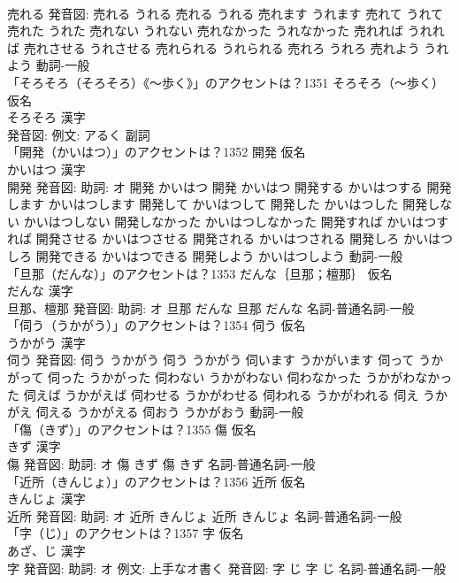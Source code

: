 \documentclass[8pt]{extreport}
\begin{document}
\begin{CJK}{UTF8}{min}
\\	売れる 発音図:	売れる うれる		売れる うれる 売れます うれます 売れて うれて 売れた うれた 売れない うれない 売れなかった うれなかった 売れれば うれれば 売れさせる うれさせる 売れられる うれられる 売れろ うれろ 売れよう うれよう				動詞-一般 
\\	「そろそろ（そろそろ）《〜歩く》」のアクセントは？1351	そろそろ（〜歩く） 仮名　
\\	そろそろ 漢字　
\\	発音図: 例文: アるく							副詞 
\\	「開発（かいはつ）」のアクセントは？1352	開発 仮名　
\\	かいはつ 漢字　
\\	開発 発音図: 助詞: オ	開発 かいはつ		開発 かいはつ 開発する かいはつする 開発します かいはつします 開発して かいはつして 開発した かいはつした 開発しない かいはつしない 開発しなかった かいはつしなかった 開発すれば かいはつすれば 開発させる かいはつさせる 開発される かいはつされる 開発しろ かいはつしろ 開発できる かいはつできる 開発しよう かいはつしよう				動詞-一般 
\\	「旦那（だんな）」のアクセントは？1353	だんな｛旦那；檀那｝ 仮名　
\\	だんな 漢字　
\\	旦那、檀那 発音図: 助詞: オ	旦那 だんな		旦那 だんな				名詞-普通名詞-一般 
\\	「伺う（うかがう）」のアクセントは？1354	伺う 仮名　
\\	うかがう 漢字　
\\	伺う 発音図:	伺う うかがう		伺う うかがう 伺います うかがいます 伺って うかがって 伺った うかがった 伺わない うかがわない 伺わなかった うかがわなかった 伺えば うかがえば 伺わせる うかがわせる 伺われる うかがわれる 伺え うかがえ 伺える うかがえる 伺おう うかがおう				動詞-一般 
\\	「傷（きず）」のアクセントは？1355	傷 仮名　
\\	きず 漢字　
\\	傷 発音図: 助詞: オ	傷 きず		傷 きず				名詞-普通名詞-一般 
\\	「近所（きんじょ）」のアクセントは？1356	近所 仮名　
\\	きんじょ 漢字　
\\	近所 発音図: 助詞: オ	近所 きんじょ		近所 きんじょ				名詞-普通名詞-一般 
\\	「字（じ）」のアクセントは？1357	字 仮名　
\\	あざ、じ 漢字　
\\	字 発音図: 助詞: オ 例文: 上手なオ書く 発音図:	字 じ		字 じ				名詞-普通名詞-一般 

\end{CJK}
\end{document}

